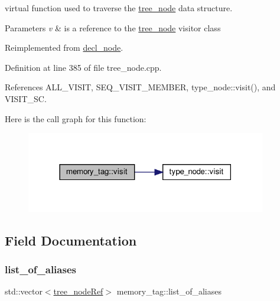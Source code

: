 virtual function used to traverse the \hyperlink{classtree__node}{tree\+\_\+node} data structure. 


\begin{DoxyParams}{Parameters}
{\em v} & is a reference to the \hyperlink{classtree__node}{tree\+\_\+node} visitor class \\
\hline
\end{DoxyParams}


Reimplemented from \hyperlink{structdecl__node_a9e63331f0c35d9af9d1997afafe9152a}{decl\+\_\+node}.



Definition at line 385 of file tree\+\_\+node.\+cpp.



References A\+L\+L\+\_\+\+V\+I\+S\+IT, S\+E\+Q\+\_\+\+V\+I\+S\+I\+T\+\_\+\+M\+E\+M\+B\+ER, type\+\_\+node\+::visit(), and V\+I\+S\+I\+T\+\_\+\+SC.

Here is the call graph for this function\+:
\nopagebreak
\begin{figure}[H]
\begin{center}
\leavevmode
\includegraphics[width=297pt]{d2/d80/structmemory__tag_a9dec2571221222773939c1629db2267b_cgraph}
\end{center}
\end{figure}


\subsection{Field Documentation}
\mbox{\label{structmemory__tag_a575a27d3f9bc790b687e8a26e2f5715d}} 
\subsubsection{\texorpdfstring{list\+\_\+of\+\_\+aliases}{list\_of\_aliases}}
{\footnotesize\ttfamily std\+::vector$<$\hyperlink{tree__node_8hpp_a6ee377554d1c4871ad66a337eaa67fd5}{tree\+\_\+node\+Ref}$>$ memory\+\_\+tag\+::list\+\_\+of\+\_\+aliases}



